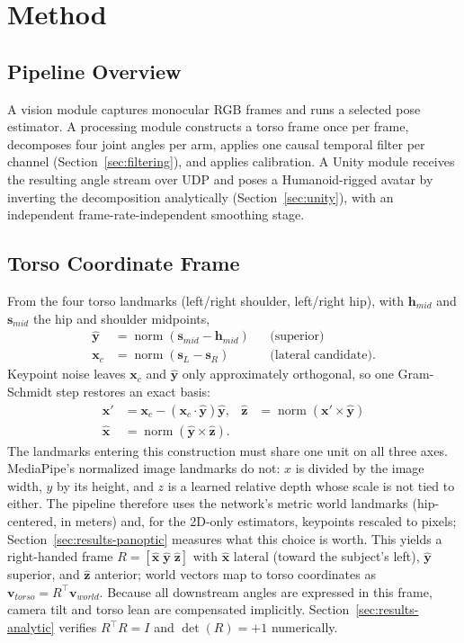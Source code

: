 \documentclass[conference]{IEEEtran}
\begin{document}
\section{Method}
\label{sec:method}

\subsection{Pipeline Overview}
A vision module captures monocular RGB frames and runs a selected pose
estimator. A processing module constructs a torso frame once per frame,
decomposes four joint angles per arm, applies one causal temporal filter
per channel (Section~\ref{sec:filtering}), and applies calibration. A
Unity module receives the resulting angle stream over UDP and poses a
Humanoid-rigged avatar by inverting the decomposition analytically
(Section~\ref{sec:unity}), with an independent frame-rate-independent
smoothing stage.

\subsection{Torso Coordinate Frame}
From the four torso landmarks (left/right shoulder, left/right hip), with
$\mathbf{h}_{mid}$ and $\mathbf{s}_{mid}$ the hip and shoulder midpoints,
\begin{align}
\hat{\mathbf{y}} &= \operatorname{norm}(\mathbf{s}_{mid} - \mathbf{h}_{mid}) &&\text{(superior)}\\
\mathbf{x}_{c} &= \operatorname{norm}(\mathbf{s}_{L} - \mathbf{s}_{R}) &&\text{(lateral candidate)}.
\end{align}
Keypoint noise leaves $\mathbf{x}_c$ and $\hat{\mathbf{y}}$ only
approximately orthogonal, so one Gram-Schmidt step restores an exact
basis:
\begin{align}
\mathbf{x}' &= \mathbf{x}_c - (\mathbf{x}_c\cdot\hat{\mathbf{y}})\hat{\mathbf{y}}, &
\hat{\mathbf{z}} &= \operatorname{norm}(\mathbf{x}' \times \hat{\mathbf{y}}) \\
\hat{\mathbf{x}} &= \operatorname{norm}(\hat{\mathbf{y}} \times \hat{\mathbf{z}}). &&
\end{align}
The landmarks entering this construction must share one unit on all three
axes. MediaPipe's normalized image landmarks do not: $x$ is divided by
the image width, $y$ by its height, and $z$ is a learned relative depth
whose scale is not tied to either. The pipeline therefore uses the
network's metric world landmarks (hip-centered, in meters) and, for the
2D-only estimators, keypoints rescaled to pixels;
Section~\ref{sec:results-panoptic} measures what this choice is worth.
This yields a right-handed frame
$R = [\hat{\mathbf{x}}\;\hat{\mathbf{y}}\;\hat{\mathbf{z}}]$ with
$\hat{\mathbf{x}}$ lateral (toward the subject's left),
$\hat{\mathbf{y}}$ superior, and $\hat{\mathbf{z}}$ anterior; world
vectors map to torso coordinates as
$\mathbf{v}_{torso} = R^{\!\top}\mathbf{v}_{world}$. Because all
downstream angles are expressed in this frame, camera tilt and torso lean
are compensated implicitly. Section~\ref{sec:results-analytic} verifies
$R^{\!\top}R = I$ and $\det(R) = +1$ numerically.
\end{document}
